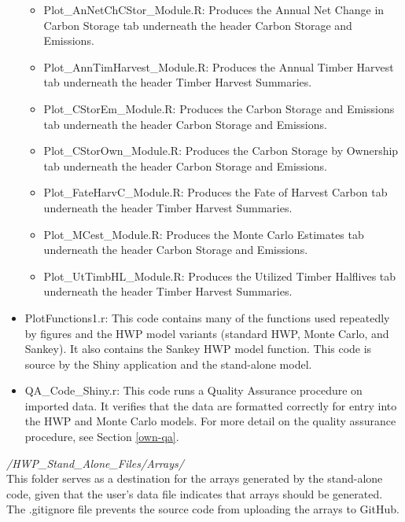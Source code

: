 \documentclass[
]{book}
\providecommand{\tightlist}{%
  \setlength{\itemsep}{0pt}\setlength{\parskip}{0pt}}
\begin{document}
\begin{itemize}
  \begin{itemize}
  \tightlist
  \item
    Plot\_AnNetChCStor\_Module.R: Produces the Annual Net Change in Carbon Storage tab underneath the header Carbon Storage and Emissions.\\
  \item
    Plot\_AnnTimHarvest\_Module.R: Produces the Annual Timber Harvest tab underneath the header Timber Harvest Summaries.\\
  \item
    Plot\_CStorEm\_Module.R: Produces the Carbon Storage and Emissions tab underneath the header Carbon Storage and Emissions.\\
  \item
    Plot\_CStorOwn\_Module.R: Produces the Carbon Storage by Ownership tab underneath the header Carbon Storage and Emissions.\\
  \item
    Plot\_FateHarvC\_Module.R: Produces the Fate of Harvest Carbon tab underneath the header Timber Harvest Summaries.\\
  \item
    Plot\_MCest\_Module.R: Produces the Monte Carlo Estimates tab underneath the header Carbon Storage and Emissions.\\
  \item
    Plot\_UtTimbHL\_Module.R: Produces the Utilized Timber Halflives tab underneath the header Timber Harvest Summaries.
  \end{itemize}
\item
  PlotFunctions1.r: This code contains many of the functions used repeatedly by figures and the HWP model variants (standard HWP, Monte Carlo, and Sankey). It also contains the Sankey HWP model function. This code is source by the Shiny application and the stand-alone model.
\item
  QA\_Code\_Shiny.r: This code runs a Quality Assurance procedure on imported data. It verifies that the data are formatted correctly for entry into the HWP and Monte Carlo models. For more detail on the quality assurance procedure, see Section \ref{own-qa}.
\end{itemize}

\emph{/HWP\_Stand\_Alone\_Files/Arrays/}\\
This folder serves as a destination for the arrays generated by the stand-alone code, given that the user's data file indicates that arrays should be generated. The .gitignore file prevents the source code from uploading the arrays to GitHub.
\end{document}
